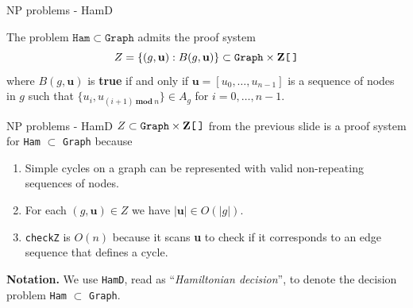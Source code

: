 \begin{frame}{NP problems - HamD}
	\begin{exl}
		The problem
		\(
			\mathtt{Ham} \subset \mathtt{Graph}
		\)
		admits the proof system
		\[
			Z= \{(g, \mathbf{u}) : B(g, \mathbf{u})\} \subset
			\mathtt{Graph} \times \mathbf{Z}\texttt{[$\,$]}
		\]
		where $B(g, \mathbf{u})$ is \textbf{true} if and only if
		\(
			\mathbf{u}= [u_0, \ldots, u_{n-1}]
		\)
		is a sequence of nodes in $g$ such that 
		\(
			\{u_i, u_{(i+1)\ \mathbf{mod}\ n}\} \in A_g
		\)
		for $i = 0, \ldots, n-1$.
	\end{exl}
\end{frame}

%

\begin{frame}{NP problems - HamD}
	\(
		Z \subset \mathtt{Graph} \times \mathbf{Z}\texttt{[\,]} 
	\)
	from the previous slide is a proof system for \texttt{Ham} $\subset$
	\texttt{Graph} because
	\begin{enumerate}
		\item Simple cycles on a graph can be represented with valid
			non-repeating sequences of nodes.
		\item For each
			\(
				(g, \mathbf{u}) \in Z
			\)
			we have $|\mathbf{u}| \in O(|g|)$.
		\item \texttt{checkZ} is $O(n)$ because it scans \textbf{u} to check
			if it corresponds to an edge sequence that defines a cycle.
	\end{enumerate}

	\bigskip

	\textbf{Notation.} We use \texttt{HamD}, read as ``\emph{Hamiltonian decision}'',
	to denote the decision problem \texttt{Ham} $\subset$ \texttt{Graph}.
\end{frame}

